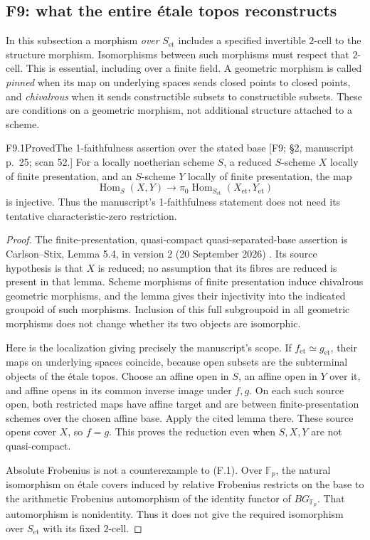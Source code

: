 \subsection{F9: what the entire \'etale topos reconstructs}

In this subsection a morphism \emph{over} $S_{\mathrm{et}}$ includes a
specified invertible $2$-cell to the structure morphism. Isomorphisms
between such morphisms must respect that $2$-cell. This is essential,
including over a finite field. A geometric morphism is called
\emph{pinned} when its map on underlying spaces sends closed points to
closed points, and \emph{chivalrous} when it sends constructible subsets
to constructible subsets. These are conditions on a geometric morphism,
not additional structure attached to a scheme.

\begin{result}{F9.1}{Proved}{The 1-faithfulness assertion over the stated base}
\textup{[F9; \S2, manuscript p.\ 25; scan 52.]}
For a locally noetherian scheme $S$, a reduced $S$-scheme $X$ locally
of finite presentation, and an $S$-scheme $Y$ locally of finite
presentation, the map
\[
 \operatorname{Hom}_S(X,Y)\longrightarrow
 \pi_0\operatorname{Hom}_{S_{\mathrm{et}}}(X_{\mathrm{et}},Y_{\mathrm{et}})
 \tag{F.1}
\]
is injective. Thus the manuscript's 1-faithfulness statement does not
need its tentative characteristic-zero restriction.
\end{result}

\begin{proof}
The finite-presentation, quasi-compact quasi-separated-base assertion is
Carlson--Stix, Lemma 5.4, in version 2 (20 September 2026)
\cite{CF_CarlsonStix2026}. Its source hypothesis is that $X$ is reduced;
no assumption that its fibres are reduced is present in that lemma.
Scheme morphisms of finite presentation induce chivalrous geometric
morphisms, and the lemma gives their injectivity into the indicated
groupoid of such morphisms. Inclusion of this full subgroupoid in all
geometric morphisms does not change whether its two objects are isomorphic.

Here is the localization giving precisely the manuscript's scope. If
$f_{\mathrm{et}}\simeq g_{\mathrm{et}}$, their maps on underlying
spaces coincide, because open subsets are the subterminal objects of
the \'etale topos. Choose an affine open in $S$, an affine open in $Y$
over it, and affine opens in its common inverse image under $f,g$.
On each such source open, both restricted maps have affine target
and are between finite-presentation schemes over the chosen affine
base. Apply the cited lemma there. These source opens cover $X$, so
$f=g$. This proves the reduction even when $S,X,Y$ are not
quasi-compact.

Absolute Frobenius is not a counterexample to (F.1). Over
$\mathbb F_p$, the natural isomorphism on \'etale covers induced by
relative Frobenius restricts on the base to the arithmetic Frobenius
automorphism of the identity functor of $B G_{\mathbb F_p}$. That
automorphism is nonidentity. Thus it does not give the required
isomorphism over $S_{\mathrm{et}}$ with its fixed $2$-cell.
\end{proof}

